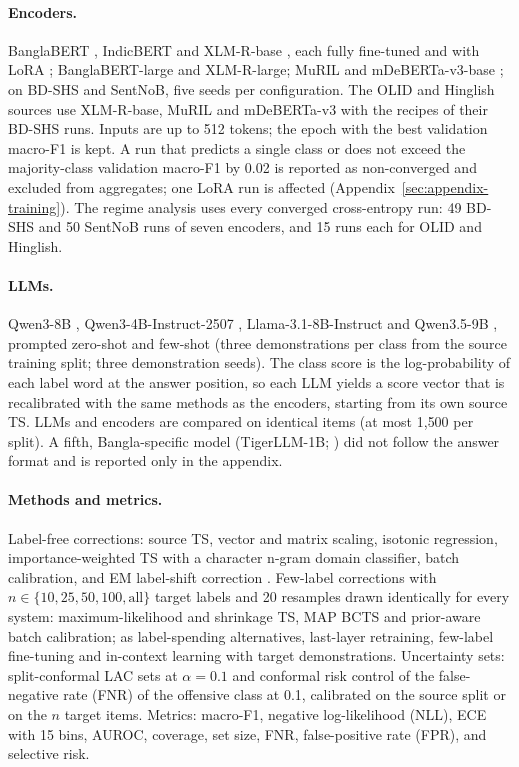 \paragraph{Encoders.}
BanglaBERT \citep{bhattacharjee2022banglabert}, IndicBERT \citep{kakwani2020indicnlpsuite} and XLM-R-base
\citep{conneau2020xlmr}, each fully fine-tuned and with LoRA \citep{hu2022lora}; BanglaBERT-large and XLM-R-large; MuRIL
\citep{khanuja2021muril} and mDeBERTa-v3-base \citep{he2023debertav3}; on BD-SHS and SentNoB, five seeds per
configuration. The OLID and Hinglish sources use XLM-R-base, MuRIL and mDeBERTa-v3 with the recipes of their BD-SHS runs.
Inputs are up to 512 tokens; the epoch with the best validation macro-F1 is kept. A run that predicts a single class or
does not exceed the majority-class validation macro-F1 by 0.02 is reported as non-converged and excluded from aggregates;
one LoRA run is affected (Appendix~\ref{sec:appendix-training}). The regime analysis uses every converged
cross-entropy run: 49 BD-SHS and 50 SentNoB runs of seven encoders, and 15 runs each for OLID and Hinglish.

\paragraph{LLMs.}
Qwen3-8B \citep{qwen3}, Qwen3-4B-Instruct-2507 \citep{qwen34b2507}, Llama-3.1-8B-Instruct \citep{llama3} and Qwen3.5-9B \citep{qwen35}, prompted zero-shot and
few-shot (three demonstrations per class from the source training split; three demonstration seeds). The class score is
the log-probability of each label word at the answer position, so each LLM yields a score vector that is recalibrated
with the same methods as the encoders, starting from its own source TS. LLMs and encoders are compared on identical items
(at most 1{,}500 per split). A fifth, Bangla-specific model (TigerLLM-1B; \citealp{raihan2025tigerllm}) did not follow the
answer format and is reported only in the appendix.

\paragraph{Methods and metrics.}
Label-free corrections: source TS, vector and matrix scaling, isotonic regression, importance-weighted TS with a
character n-gram domain classifier, batch calibration, and EM label-shift correction \citep{saerens2002adjusting}.
Few-label corrections with $n \in \{10, 25, 50, 100, \text{all}\}$ target labels and 20 resamples drawn identically for
every system: maximum-likelihood and shrinkage TS, MAP BCTS and prior-aware batch calibration; as label-spending
alternatives, last-layer retraining, few-label fine-tuning and in-context learning with target demonstrations.
Uncertainty sets: split-conformal LAC sets at $\alpha = 0.1$ and conformal risk control \citep{angelopoulos2024crc} of
the false-negative rate (FNR) of the offensive class at 0.1, calibrated on the source split or on the $n$ target items.
Metrics: macro-F1, negative log-likelihood (NLL), ECE with 15 bins, AUROC, coverage, set size, FNR, false-positive rate
(FPR), and selective risk.

